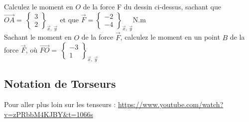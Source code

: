 \documentclass[
	11pt, %
	fleqn, %
	a4paper, %
]{LegrandOrangeBook}
\begin{document}
\begin{Exercice}
    Calculez le moment en $O$ de la force F du dessin ci-dessus, sachant que $\overrightarrow{OA}=\ \begin{Bmatrix} 3\\ 2 \end{Bmatrix}_{\vec{x} ,\ \vec{y}}$ et que $\Vec{F}=\begin{Bmatrix} -2\\ -4 \end{Bmatrix}_{\vec{x} ,\ \vec{y}}$N.m \\

Sachant le moment en $O$ de la force $\Vec{F}$, calculez le moment en un point $B$ de la force $\Vec{F}$, où $\overrightarrow{FO}=\ \begin{Bmatrix} -3\\ 1 \end{Bmatrix}_{\vec{x} ,\ \vec{y}}$

\end{Exercice}


\begin{Exercice}
    

\begin{figure}[H]  %
	\centering %
\end{figure}


\end{Exercice}

\subsection{Notation de Torseurs}


Pour aller plus loin sur les tenseurs : \url{https://www.youtube.com/watch?v=zPRbbM4KJBY&t=1066s}
\end{document}
